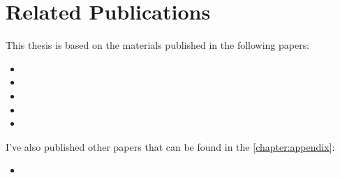\section{Related Publications}

This thesis is based on the materials published in the following papers:

\begin{itemize}
      \item {}
      \item {}
      \item {}
      \item {}
      \item {}
\end{itemize}

I've also published other papers that can be found in the \autoref{chapter:appendix}:

\begin{itemize}
      \item {}
\end{itemize}

